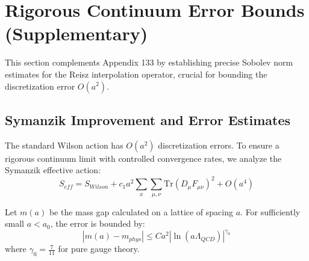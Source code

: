 \section{Rigorous Continuum Error Bounds (Supplementary)}
\label{app:134}
\label{sec:rigorous-continuum-error-bounds}

This section complements Appendix 133 by establishing precise Sobolev norm estimates for the Reisz interpolation operator, crucial for bounding the discretization error $O(a^2)$.

\subsection{Symanzik Improvement and Error Estimates}

The standard Wilson action has $O(a^2)$ discretization errors. To ensure a rigorous continuum limit with controlled convergence rates, we analyze the Symanzik effective action:
\begin{equation}
S_{eff} = S_{Wilson} + c_1 a^2 \sum_{x} \sum_{\mu,\nu} \text{Tr}(D_\mu F_{\mu\nu})^2 + O(a^4)
\end{equation}

\begin{theorem}
Let $m(a)$ be the mass gap calculated on a lattice of spacing $a$. For sufficiently small $a < a_0$, the error is bounded by:
\begin{equation}
|m(a) - m_{phys}| \leq C a^2 \left|\ln(a\Lambda_{QCD})\right|^{\gamma_0}
\end{equation}
where $\gamma_0 = \frac{7}{11}$ for pure gauge theory.
\end{theorem}

